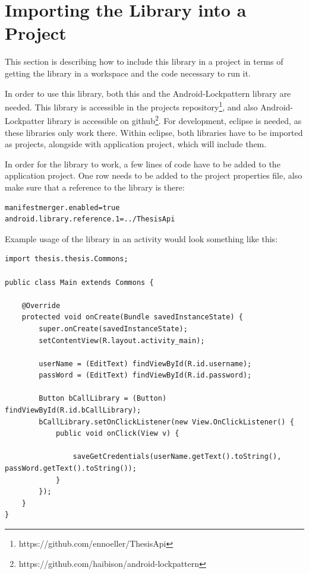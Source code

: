 \newpage

\section{Importing the Library into a Project}
This section is describing how to include this library in a project in terms of getting the library in a workspace and the code necessary to run it. 

In order to use this library, both this and the Android-Lockpattern library are needed. This library is accessible in the projects repository\footnote[14]{https://github.com/ennoeller/ThesisApi}, and also Android-Lockpatter library is accessible on github\footnote[15]{https://github.com/haibison/android-lockpattern}. For development, eclipse is needed, as these libraries only work there. Within eclipse, both libraries have to be imported as projects, alongside with application project, which will include them. 

In order for the library to work, a few lines of code have to be added to the application project. One row needs to be added to the project properties file, also make sure that a reference to the library is there:

\begin{lstlisting}
manifestmerger.enabled=true
android.library.reference.1=../ThesisApi
\end{lstlisting} 
	
Example usage of the library in an activity would look something like this:

\lstset{language=Java}

\begin{lstlisting}
import thesis.thesis.Commons;

public class Main extends Commons {

    @Override
	protected void onCreate(Bundle savedInstanceState) {
		super.onCreate(savedInstanceState);
		setContentView(R.layout.activity_main);

		userName = (EditText) findViewById(R.id.username);
		passWord = (EditText) findViewById(R.id.password);
		
		Button bCallLibrary = (Button) findViewById(R.id.bCallLibrary);
		bCallLibrary.setOnClickListener(new View.OnClickListener() {
			public void onClick(View v) {

				saveGetCredentials(userName.getText().toString(), passWord.getText().toString());
			}
		});	
	}
}
\end{lstlisting}




